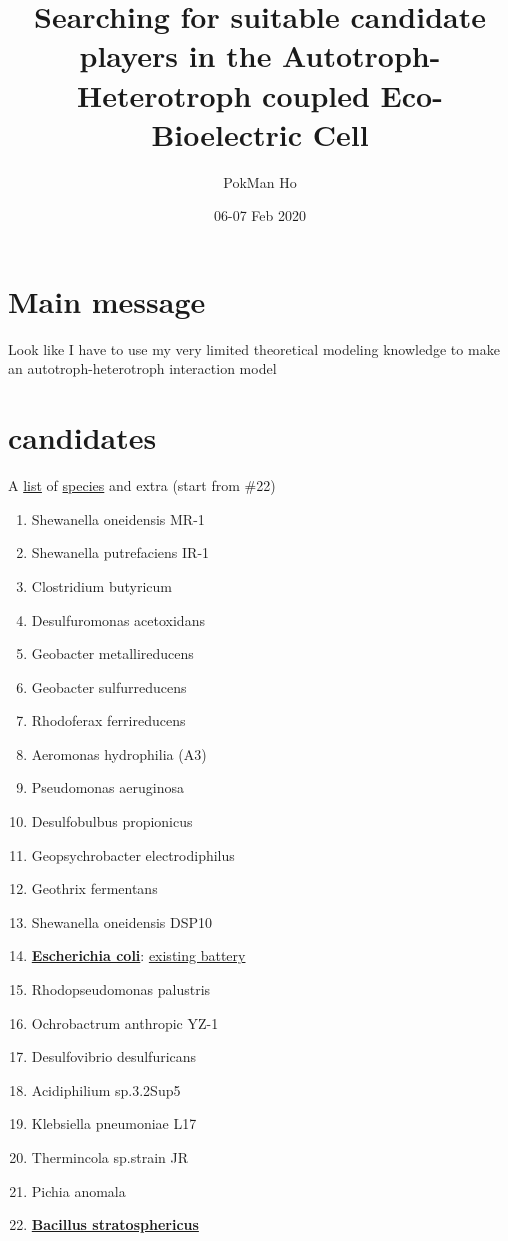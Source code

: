 \documentclass[a4paper,11pt]{article}
\title{Searching for suitable candidate players in the Autotroph-Heterotroph coupled Eco-Bioelectric Cell}
\author{PokMan Ho}
\date{06-07 Feb 2020}
\begin{document}
    \maketitle
    \tableofcontents
    
    \section{Main message}
    Look like I have to use my very limited theoretical modeling knowledge to make an autotroph-heterotroph interaction model
    
    \section{candidates}
    A \href{https://www.nature.com/articles/nrmicro2113}{list} of \href{https://en.wikipedia.org/wiki/Exoelectrogen}{species} and extra (start from \#22)
    
    \begin{enumerate}
            \item Shewanella oneidensis MR-1
            \item Shewanella putrefaciens IR-1
            \item Clostridium butyricum
            \item Desulfuromonas acetoxidans
            \item Geobacter metallireducens
            \item Geobacter sulfurreducens
            \item Rhodoferax ferrireducens
            \item Aeromonas hydrophilia (A3)
            \item Pseudomonas aeruginosa
            \item Desulfobulbus propionicus
            \item Geopsychrobacter electrodiphilus
            \item Geothrix fermentans
            \item Shewanella oneidensis DSP10
            \item \href{https://microbewiki.kenyon.edu/index.php/Escherichia_coli}{\textbf{Escherichia coli}}: \href{https://www.greenoptimistic.com/bio-battery-e-coli-20130718/}{existing battery}
            \item Rhodopseudomonas palustris
            \item Ochrobactrum anthropic YZ-1
            \item Desulfovibrio desulfuricans
            \item Acidiphilium sp.3.2Sup5
            \item Klebsiella pneumoniae L17
            \item Thermincola sp.strain JR
            \item Pichia anomala
            \item \href{https://pubs.acs.org/doi/pdf/10.1021/es2020007}{\textbf{Bacillus stratosphericus}}
        \end{enumerate}
    
\end{document}
